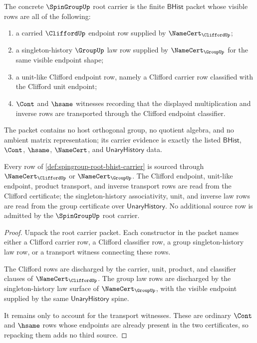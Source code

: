 \begin{definition}
\label{def:spingroup-root-bhist-carrier}
The concrete $\SpinGroupUp$ root carrier is the finite $\mathsf{BHist}$ packet whose visible rows are all of the following:
\begin{enumerate}
  \item a carried $\CliffordUp$ endpoint row supplied by $\NameCert_{\CliffordUp}$;
  \item a singleton-history $\GroupUp$ law row supplied by $\NameCert_{\GroupUp}$ for the same visible endpoint shape;
  \item a unit-like Clifford endpoint row, namely a Clifford carrier row classified with the Clifford unit endpoint;
  \item $\Cont$ and $\hsame$ witnesses recording that the displayed multiplication and inverse rows are transported through the Clifford endpoint classifier.
\end{enumerate}
The packet contains no host orthogonal group, no quotient algebra, and no ambient matrix representation; its carrier evidence is exactly the listed $\mathsf{BHist}$, $\Cont$, $\hsame$, $\NameCert$, and $\mathsf{UnaryHistory}$ data.
\end{definition}

\begin{theorem}
\label{thm:spingroup-root-carrier-source-scope}
Every row of \autoref{def:spingroup-root-bhist-carrier} is sourced through $\NameCert_{\CliffordUp}$ or $\NameCert_{\GroupUp}$. The Clifford endpoint, unit-like endpoint, product transport, and inverse transport rows are read from the Clifford certificate; the singleton-history associativity, unit, and inverse law rows are read from the group certificate over $\mathsf{UnaryHistory}$. No additional source row is admitted by the $\SpinGroupUp$ root carrier.
\end{theorem}
\begin{proof}
Unpack the root carrier packet. Each constructor in the packet names either a Clifford carrier row, a Clifford classifier row, a group singleton-history law row, or a transport witness connecting these rows.

The Clifford rows are discharged by the carrier, unit, product, and classifier clauses of $\NameCert_{\CliffordUp}$. The group law rows are discharged by the singleton-history law surface of $\NameCert_{\GroupUp}$, with the visible endpoint supplied by the same $\mathsf{UnaryHistory}$ spine.

It remains only to account for the transport witnesses. These are ordinary $\Cont$ and $\hsame$ rows whose endpoints are already present in the two certificates, so repacking them adds no third source.
\end{proof}

